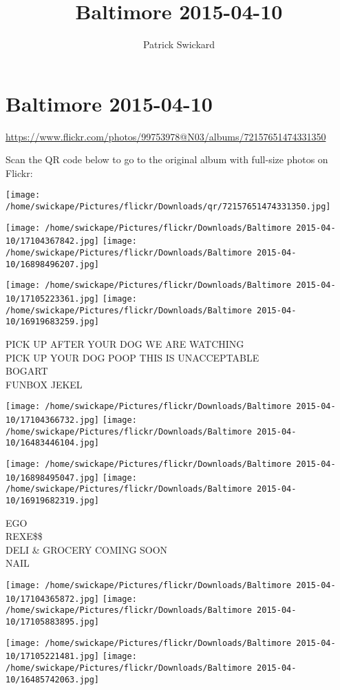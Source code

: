 \documentclass[10pt,letterpaper]{article}
\title{Baltimore 2015-04-10}
\author{Patrick Swickard}
\date{}
\begin{document}
\section*{Baltimore 2015-04-10}

\url{https://www.flickr.com/photos/99753978@N03/albums/72157651474331350}

Scan the QR code below to go to the original album with full-size photos on Flickr:

\texttt{[image: /home/swickape/Pictures/flickr/Downloads/qr/72157651474331350.jpg]}
\pagebreak

\texttt{[image: /home/swickape/Pictures/flickr/Downloads/Baltimore 2015-04-10/17104367842.jpg]}
\texttt{[image: /home/swickape/Pictures/flickr/Downloads/Baltimore 2015-04-10/16898496207.jpg]}

\texttt{[image: /home/swickape/Pictures/flickr/Downloads/Baltimore 2015-04-10/17105223361.jpg]}
\texttt{[image: /home/swickape/Pictures/flickr/Downloads/Baltimore 2015-04-10/16919683259.jpg]}

PICK UP AFTER YOUR DOG WE ARE WATCHING\\
PICK UP YOUR DOG POOP THIS IS UNACCEPTABLE\\
BOGART\\
FUNBOX JEKEL
\pagebreak

\texttt{[image: /home/swickape/Pictures/flickr/Downloads/Baltimore 2015-04-10/17104366732.jpg]}
\texttt{[image: /home/swickape/Pictures/flickr/Downloads/Baltimore 2015-04-10/16483446104.jpg]}

\texttt{[image: /home/swickape/Pictures/flickr/Downloads/Baltimore 2015-04-10/16898495047.jpg]}
\texttt{[image: /home/swickape/Pictures/flickr/Downloads/Baltimore 2015-04-10/16919682319.jpg]}

EGO\\
REXE\$\$\\
DELI \& GROCERY COMING SOON\\
NAIL
\pagebreak

\texttt{[image: /home/swickape/Pictures/flickr/Downloads/Baltimore 2015-04-10/17104365872.jpg]}
\texttt{[image: /home/swickape/Pictures/flickr/Downloads/Baltimore 2015-04-10/17105883895.jpg]}

\texttt{[image: /home/swickape/Pictures/flickr/Downloads/Baltimore 2015-04-10/17105221481.jpg]}
\texttt{[image: /home/swickape/Pictures/flickr/Downloads/Baltimore 2015-04-10/16485742063.jpg]}
\end{document}
